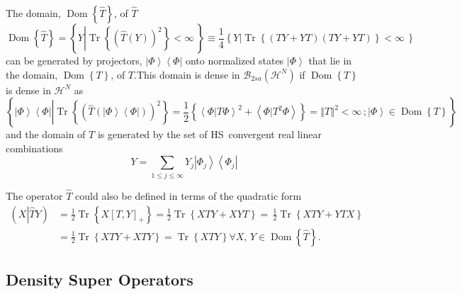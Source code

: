 \documentclass[aps,preprint]{revtex4}%
\begin{document}
The domain, $\operatorname{Dom}\left\{  \widehat{T}\right\}  $, of
$\widehat{T}$
\begin{equation}
\operatorname{Dom}\left\{  \widehat{T}\right\}  =\left\{  Y\left\vert
\operatorname{Tr}\left\{  \left(  \widehat{T}\left(  Y\right)  \right)
^{2}\right\}  <\infty\,\right.  \right\}  \equiv\frac{1}{4}\left\{  \left.
Y\right\vert \operatorname{Tr}\left\{  \left(  TY+YT\right)  \left(
TY+YT\right)  \right\}  <\infty\,\right\}
\end{equation}
can be generated by projectors, $\left\vert \Phi\right\rangle \left\langle
\Phi\right\vert $ onto normalized states $\left\vert \Phi\right\rangle $ that
lie in the domain, $\operatorname{Dom}\left\{  T\right\}  $, of $T.$This
domain is dense in $\mathcal{B}_{2sa}\left(  \mathcal{H}^{N}\right)  $ if
$\operatorname{Dom}\left\{  T\right\}  $ is dense in $\mathcal{H}^{N}$ as
\[
\left\{  \left\vert \Phi\right\rangle \left\langle \Phi\right\vert \left\vert
\operatorname{Tr}\left\{  \left(  \widehat{T}\left(  \left\vert \Phi
\right\rangle \left\langle \Phi\right\vert \right)  \right)  ^{2}\right\}
=\frac{1}{2}\left\{  \left\langle \left.  \Phi\right\vert T\Phi\right\rangle
^{2}+\left\langle \left.  \Phi\right\vert T^{2}\Phi\right\rangle \right\}
=\left\Vert T\right\Vert ^{2}<\infty\,\right.  ;\left\vert \Phi\right\rangle
\in\operatorname{Dom}\left\{  T\right\}  \right\}
\]
and the domain of $T$ is generated by the set of HS\ convergent real linear
combinations%
\begin{equation}
Y=\sum_{1\leq j\leq\infty}Y_{j}\left\vert \Phi_{j}\right\rangle \left\langle
\Phi_{j}\right\vert
\end{equation}


The operator $\widehat{T}$ could also be defined in terms of the quadratic
form
\begin{align}
\left(  X\left\vert \widehat{T}Y\right.  \right)   &  =\frac{1}{2}%
\operatorname{Tr}\left\{  X\left[  T,Y\right]  _{+}\right\}  =\frac{1}%
{2}\operatorname{Tr}\left\{  XTY+XYT\right\}  =\,\frac{1}{2}\operatorname{Tr}%
\left\{  XTY+YTX\right\} \nonumber\\
&  =\frac{1}{2}\operatorname{Tr}\left\{  XTY+XTY\right\}  =\operatorname{Tr}%
\left\{  XTY\right\}  \forall X,\,Y\in\operatorname{Dom}\left\{
\widehat{T}\right\}  .
\end{align}


\subsection{Density Super Operators \label{Den Sup Ops}}
\end{document}
